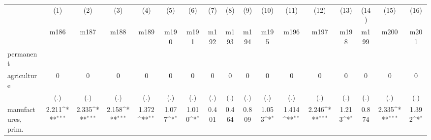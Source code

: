 {
\def\sym#1{\ifmmode^{#1}\else\(^{#1}\)\fi}
\begin{tabular}{l*{16}{c}}
\hline\hline
                    &\multicolumn{1}{c}{(1)}&\multicolumn{1}{c}{(2)}&\multicolumn{1}{c}{(3)}&\multicolumn{1}{c}{(4)}&\multicolumn{1}{c}{(5)}&\multicolumn{1}{c}{(6)}&\multicolumn{1}{c}{(7)}&\multicolumn{1}{c}{(8)}&\multicolumn{1}{c}{(9)}&\multicolumn{1}{c}{(10)}&\multicolumn{1}{c}{(11)}&\multicolumn{1}{c}{(12)}&\multicolumn{1}{c}{(13)}&\multicolumn{1}{c}{(14)}&\multicolumn{1}{c}{(15)}&\multicolumn{1}{c}{(16)}\\
                    &\multicolumn{1}{c}{m186}&\multicolumn{1}{c}{m187}&\multicolumn{1}{c}{m188}&\multicolumn{1}{c}{m189}&\multicolumn{1}{c}{m190}&\multicolumn{1}{c}{m191}&\multicolumn{1}{c}{m192}&\multicolumn{1}{c}{m193}&\multicolumn{1}{c}{m194}&\multicolumn{1}{c}{m195}&\multicolumn{1}{c}{m196}&\multicolumn{1}{c}{m197}&\multicolumn{1}{c}{m198}&\multicolumn{1}{c}{m199}&\multicolumn{1}{c}{m200}&\multicolumn{1}{c}{m201}\\
\hline
permanent           &                     &                     &                     &                     &                     &                     &                     &                     &                     &                     &                     &                     &                     &                     &                     &                     \\
agriculture         &           0         &           0         &           0         &           0         &           0         &           0         &           0         &           0         &           0         &           0         &           0         &           0         &           0         &           0         &           0         &           0         \\
                    &         (.)         &         (.)         &         (.)         &         (.)         &         (.)         &         (.)         &         (.)         &         (.)         &         (.)         &         (.)         &         (.)         &         (.)         &         (.)         &         (.)         &         (.)         &         (.)         \\
[1em]
manufactures, prim. &       2.211\sym{***}&       2.335\sym{***}&       2.158\sym{***}&       1.372\sym{**} &       1.077\sym{*}  &       1.010\sym{*}  &       0.401         &       0.464         &       0.809         &       1.053\sym{*}  &       1.414\sym{**} &       2.246\sym{***}&       1.213\sym{*}  &       0.874         &       2.335\sym{***}&       1.392\sym{*}  \\

\end{tabular}}

